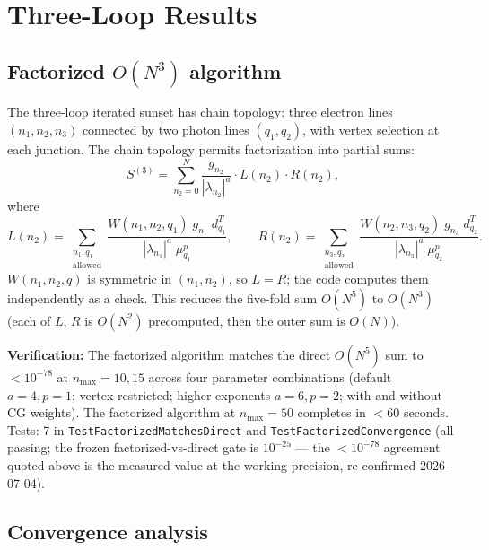 \documentclass[11pt]{article}
\begin{document}
\section{Three-Loop Results}
\label{sec:three_loop}

\subsection{Factorized $O(N^3)$ algorithm}

The three-loop iterated sunset has chain topology: three electron
lines $(n_1, n_2, n_3)$ connected by two photon lines $(q_1, q_2)$,
with vertex selection at each junction.  The chain topology permits
factorization into partial sums:
\begin{equation}
  S^{(3)} = \sum_{n_2=0}^{N}
    \frac{g_{n_2}}{|\lambda_{n_2}|^a}
    \cdot L(n_2) \cdot R(n_2),
  \label{eq:three_loop_factorized}
\end{equation}
where
\begin{equation}
  L(n_2) = \sum_{\substack{n_1, q_1 \\ \text{allowed}}}
    \frac{W(n_1, n_2, q_1) \; g_{n_1} \; d_{q_1}^T}
         {|\lambda_{n_1}|^a \; \mu_{q_1}^p}, \qquad
  R(n_2) = \sum_{\substack{n_3, q_2 \\ \text{allowed}}}
    \frac{W(n_2, n_3, q_2) \; g_{n_3} \; d_{q_2}^T}
         {|\lambda_{n_3}|^a \; \mu_{q_2}^p}.
  \label{eq:LR_partial}
\end{equation}
$W(n_1, n_2, q)$ is symmetric in $(n_1, n_2)$, so $L = R$; the code
computes them independently as a check.  This reduces the five-fold sum
$O(N^5)$ to $O(N^3)$ (each of $L$, $R$ is $O(N^2)$ precomputed,
then the outer sum is $O(N)$).

\noindent\textbf{Verification:} The factorized algorithm matches the
direct $O(N^5)$ sum to $< 10^{-78}$ at $n_{\max} = 10, 15$ across
four parameter combinations (default $a=4,p=1$; vertex-restricted;
higher exponents $a=6,p=2$; with and without CG weights).  The
factorized algorithm at $n_{\max} = 50$ completes in $< 60$ seconds.
Tests: 7 in \texttt{TestFactorizedMatchesDirect} and
\texttt{TestFactorizedConvergence} (all passing; the frozen
factorized-vs-direct gate is $10^{-25}$ --- the $< 10^{-78}$
agreement quoted above is the measured value at the working
precision, re-confirmed 2026-07-04).

\subsection{Convergence analysis}
\end{document}
